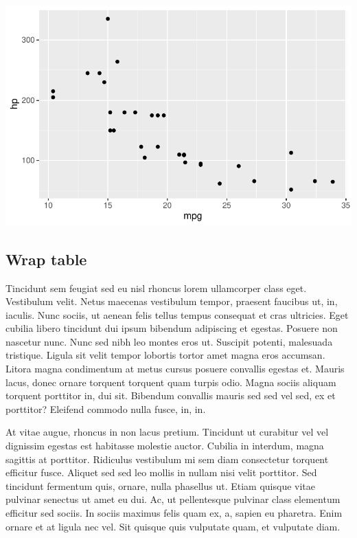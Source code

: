 \documentclass[
  9pt,
  letterpaper,
  DIV=11,
  numbers=noendperiod]{scrartcl}
\begin{document}
\includegraphics{man_files/figure-pdf/unnamed-chunk-9-1.pdf}

\newpage{}

\hypertarget{wrap-table}{%
\subsection{Wrap table}\label{wrap-table}}

Tincidunt sem feugiat sed eu nisl rhoncus lorem ullamcorper class eget.
Vestibulum velit. Netus maecenas vestibulum tempor, praesent faucibus
ut, in, iaculis. Nunc sociis, ut aenean felis tellus tempus consequat et
cras ultricies. Eget cubilia libero tincidunt dui ipsum bibendum
adipiscing et egestas. Posuere non nascetur nunc. Nunc sed nibh leo
montes eros ut. Suscipit potenti, malesuada tristique. Ligula sit velit
tempor lobortis tortor amet magna eros accumsan. Litora magna
condimentum at metus cursus posuere convallis egestas et. Mauris lacus,
donec ornare torquent torquent quam turpis odio. Magna sociis aliquam
torquent porttitor in, dui sit. Bibendum convallis mauris sed sed vel
sed, ex et porttitor? Eleifend commodo nulla fusce, in, in.

At vitae augue, rhoncus in non lacus pretium. Tincidunt ut curabitur vel
vel dignissim egestas est habitasse molestie auctor. Cubilia in
interdum, magna sagittis at porttitor. Ridiculus vestibulum mi sem diam
consectetur torquent efficitur fusce. Aliquet sed sed leo mollis in
nullam nisi velit porttitor. Sed tincidunt fermentum quis, ornare, nulla
phasellus ut. Etiam quisque vitae pulvinar senectus ut amet eu dui. Ac,
ut pellentesque pulvinar class elementum efficitur sed sociis. In sociis
maximus felis quam ex, a, sapien eu pharetra. Enim ornare et at ligula
nec vel. Sit quisque quis vulputate quam, et vulputate diam.
\end{document}
